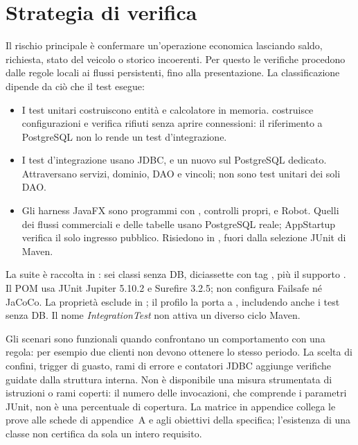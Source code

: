 \section{Strategia di verifica}\label{sec:test-strategia}
Il rischio principale è confermare un'operazione economica lasciando saldo,
richiesta, stato del veicolo o storico incoerenti. Per questo le verifiche
procedono dalle regole locali ai flussi persistenti, fino alla presentazione.
La classificazione dipende da ciò che il test esegue:
\begin{itemize}
\item I test unitari costruiscono entità e calcolatore in memoria.
   costruisce configurazioni e verifica
  rifiuti senza aprire connessioni: il riferimento a PostgreSQL non lo
  rende un test d'integrazione.
\item I test d'integrazione usano JDBC,  e un
   nuovo sul PostgreSQL dedicato. Attraversano servizi,
  dominio, DAO e vincoli; non sono test unitari dei soli DAO.
\item Gli harness JavaFX sono programmi con , controlli propri,
   e Robot. Quelli dei flussi commerciali e delle tabelle
  usano PostgreSQL reale; AppStartup verifica il solo ingresso pubblico.
  Risiedono in , fuori dalla selezione JUnit di Maven.
\end{itemize}
La suite è raccolta in : sei classi
senza DB, diciassette con tag , più il supporto
. Il POM usa JUnit Jupiter 5.10.2 e Surefire 3.2.5;
non configura Failsafe né JaCoCo. La proprietà 
esclude  in ; il profilo
 la porta a , includendo anche i test
senza DB. Il nome \emph{IntegrationTest} non attiva un diverso ciclo Maven.

Gli scenari sono funzionali quando confrontano un comportamento con una
regola: per esempio due clienti non devono ottenere lo stesso periodo.
La scelta di confini, trigger di guasto, rami di errore e contatori JDBC
aggiunge verifiche guidate dalla struttura interna. Non è disponibile una
misura strumentata di istruzioni o rami coperti: il numero delle invocazioni,
che comprende i parametri JUnit, non è una percentuale di copertura.
La matrice in appendice collega le prove alle schede di appendice~A e agli
obiettivi della specifica; l'esistenza di una classe non certifica da sola
un intero requisito.

